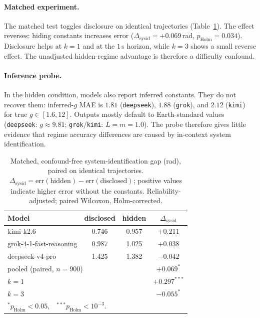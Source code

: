 \documentclass{article}
\begin{document}
\paragraph{Matched experiment.} The matched test toggles disclosure on identical
trajectories (Table~\ref{tab:sysid}). The effect reverses: hiding constants increases error
($\Delta_{\mathrm{sysid}}{=}{+}0.069$\,rad, $p_{\mathrm{Holm}}{=}0.034$). Disclosure helps
at $k{=}1$ and at the $1$\,s horizon, while $k{=}3$ shows a small reverse effect. The
unadjusted hidden-regime advantage is therefore a difficulty confound.

\paragraph{Inference probe.} In the hidden condition, models also report inferred constants.
They do not recover them: inferred-$g$ MAE is $1.81$ (\texttt{deepseek}), $1.88$
(\texttt{grok}), and $2.12$ (\texttt{kimi}) for true $g\in[1.6,12]$. Outputs mostly default
to Earth-standard values (\texttt{deepseek}: $g{\approx}9.81$; \texttt{grok}/\texttt{kimi}:
$L{=}m{=}1.0$). The probe therefore gives little evidence that regime accuracy differences
are caused by in-context system identification.

\begin{table}[tbp]
\centering\small
\caption{Matched, confound-free system-identification gap (rad), paired on identical
trajectories. $\Delta_{\mathrm{sysid}}=\mathrm{err}(\text{hidden})-
\mathrm{err}(\text{disclosed})$; positive values indicate higher error without the
constants. Reliability-adjusted; paired Wilcoxon, Holm-corrected.}\label{tab:sysid}
\begin{tabular}{lccc}
\toprule
Model & disclosed & hidden & $\Delta_{\mathrm{sysid}}$ \\
\midrule
kimi-k2.6 & 0.746 & 0.957 & $+0.211$ \\
grok-4-1-fast-reasoning & 0.987 & 1.025 & $+0.038$ \\
deepseek-v4-pro & 1.425 & 1.382 & $-0.042$ \\
\midrule
\multicolumn{3}{l}{pooled (paired, $n{=}900$)} & $+0.069^{*}$ \\
\multicolumn{3}{l}{\quad $k{=}1$} & $+0.297^{***}$ \\
\multicolumn{3}{l}{\quad $k{=}3$} & $-0.055^{*}$ \\
\bottomrule
\multicolumn{4}{l}{\footnotesize $^{*}p_{\mathrm{Holm}}{<}0.05$,\ \ $^{***}p_{\mathrm{Holm}}{<}10^{-3}$.}
\end{tabular}
\end{table}
\end{document}
